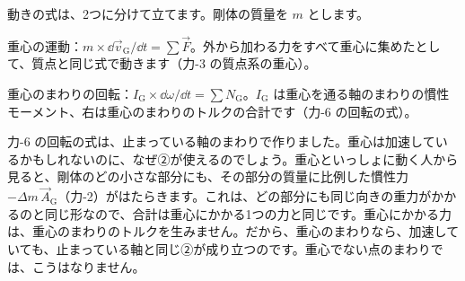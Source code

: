 動きの式は、2つに分けて立てます。剛体の質量を $m$ とします。
\begin{enumerate}[label={\bkcircled[bkBlue]{\arabic*}}, leftmargin=2.4\zw, itemsep=1pt, topsep=2pt]
\item 重心の運動：$m\times\dd\vec v_\mathrm{G}/\dd t=\sum\vec F$。外から加わる力をすべて重心に集めたとして、質点と同じ式で動きます（力-3 の質点系の重心）。
\item 重心のまわりの回転：$I_\mathrm{G}\times\dd\omega/\dd t=\sum N_\mathrm{G}$。$I_\mathrm{G}$ は重心を通る軸のまわりの慣性モーメント、右は重心のまわりのトルクの合計です（力-6 の回転の式）。
\end{enumerate}
\begin{seikaku}
力-6 の回転の式は、止まっている軸のまわりで作りました。重心は加速しているかもしれないのに、なぜ②が使えるのでしょう。重心といっしょに動く人から見ると、剛体のどの小さな部分にも、その部分の質量に比例した慣性力 $-\Delta m\,\vec A_\mathrm{G}$（力-2）がはたらきます。これは、どの部分にも同じ向きの重力がかかるのと同じ形なので、合計は重心にかかる1つの力と同じです。重心にかかる力は、重心のまわりのトルクを生みません。だから、重心のまわりなら、加速していても、止まっている軸と同じ②が成り立つのです。重心でない点のまわりでは、こうはなりません。
\end{seikaku}

